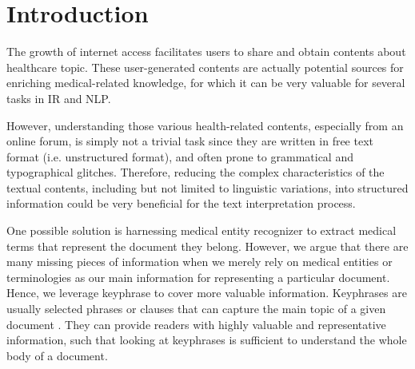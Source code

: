 \documentclass[sigconf]{acmart}
\begin{document}
	\section{Introduction}
	The growth of internet access facilitates users to share and obtain contents about healthcare topic. These user-generated contents are actually potential sources for enriching medical-related knowledge, for which it can be very valuable for several tasks in IR and NLP.
	
	However, understanding those various health-related contents, especially from an online forum, is simply not a trivial task since they are written in free text format (i.e. unstructured format), and often prone to grammatical and typographical glitches. Therefore, reducing the complex characteristics of the textual contents, including but not limited to linguistic variations, into structured information could be very beneficial for the text interpretation process. 
	
	One possible solution is harnessing medical entity recognizer to extract medical terms that represent the document they belong. However, we argue that there are many missing pieces of information when we merely rely on medical entities or terminologies as our main information for representing a particular document. Hence, we leverage keyphrase to cover more valuable information. Keyphrases are usually selected phrases or clauses that can capture the main topic of a given document \cite{turney2000learning}. They can provide readers with highly valuable and representative information, such that looking at keyphrases is sufficient to understand the whole body of a document.
	
\end{document}
